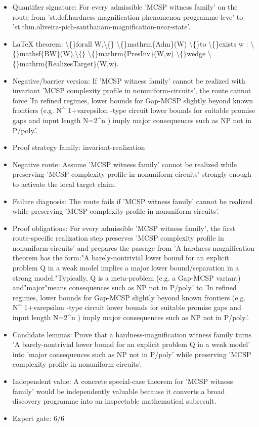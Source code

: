 \documentclass[11pt]{article}
\begin{document}
\begin{itemize}
\item Quantifier signature: For every admissible 'MCSP witness family' on the route from 'st.def.hardness-magnification-phenomenon-programme-leve' to 'st.thm.oliveira-pich-santhanam-magnification-near-state'.
\item LaTeX theorem: \textbackslash\{\}forall W,\textbackslash\{\} \textbackslash\{\}mathrm\{Adm\}(W) \textbackslash\{\}to \textbackslash\{\}exists w : \textbackslash\{\}mathsf\{BW\}(W),\textbackslash\{\} \textbackslash\{\}mathrm\{PresInv\}(W,w) \textbackslash\{\}wedge \textbackslash\{\}mathrm\{RealizesTarget\}(W,w).
\item Negative/barrier version: If 'MCSP witness family' cannot be realized with invariant 'MCSP complexity profile in nonuniform-circuits', the route cannot force 'In refined regimes, lower bounds for Gap-MCSP slightly beyond known frontiers (e.g. N\textasciicircum{} 1+varepsilon -type circuit lower bounds for suitable promise gaps and input length N=2\textasciicircum{}n ) imply major consequences such as NP not in P/poly.'.
\item Proof strategy family: invariant-realization
\item Negative route: Assume 'MCSP witness family' cannot be realized while preserving 'MCSP complexity profile in nonuniform-circuits' strongly enough to activate the local target claim.
\item Failure diagnosis: The route fails if 'MCSP witness family' cannot be realized while preserving 'MCSP complexity profile in nonuniform-circuits'.
\item Proof obligations: For every admissible 'MCSP witness family', the first route-specific realization step preserves 'MCSP complexity profile in nonuniform-circuits' and prepares the passage from 'A hardness magnification theorem has the form:"A barely-nontrivial lower bound for an explicit problem Q in a weak model implies a major lower bound/separation in a strong model."Typically, Q is a meta-problem (e.g. a Gap-MCSP variant) and"major"means consequences such as NP not in P/poly.' to 'In refined regimes, lower bounds for Gap-MCSP slightly beyond known frontiers (e.g. N\textasciicircum{} 1+varepsilon -type circuit lower bounds for suitable promise gaps and input length N=2\textasciicircum{}n ) imply major consequences such as NP not in P/poly.'.
\item Candidate lemmas: Prove that a hardness-magnification witness family turns 'A barely-nontrivial lower bound for an explicit problem Q in a weak model' into 'major consequences such as NP not in P/poly' while preserving 'MCSP complexity profile in nonuniform-circuits'.
\item Independent value: A concrete special-case theorem for 'MCSP witness family' would be independently valuable because it converts a broad discovery programme into an inspectable mathematical subresult.
\item Expert gate: 6/6
\end{itemize}
\end{document}
